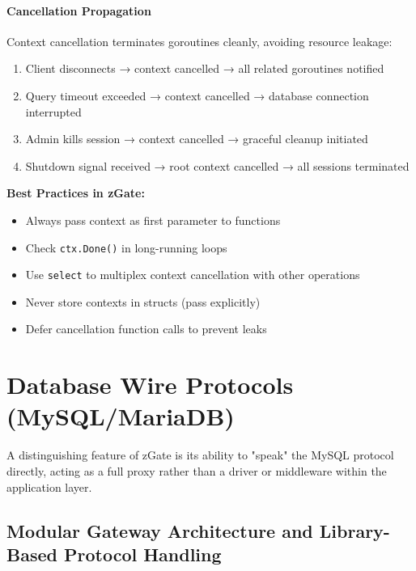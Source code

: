 \paragraph{Cancellation Propagation}

Context cancellation terminates goroutines cleanly, avoiding resource leakage:

\begin{enumerate}
    \item Client disconnects → context cancelled → all related goroutines notified
    \item Query timeout exceeded → context cancelled → database connection interrupted
    \item Admin kills session → context cancelled → graceful cleanup initiated
    \item Shutdown signal received → root context cancelled → all sessions terminated
\end{enumerate}

\textbf{Best Practices in zGate:}
\begin{itemize}
    \item Always pass context as first parameter to functions
    \item Check \texttt{ctx.Done()} in long-running loops
    \item Use \texttt{select} to multiplex context cancellation with other operations
    \item Never store contexts in structs (pass explicitly)
    \item Defer cancellation function calls to prevent leaks
\end{itemize}

\section{Database Wire Protocols (MySQL/MariaDB)}

A distinguishing feature of zGate is its ability to "speak" the MySQL protocol directly, acting as a full proxy rather than a driver or middleware within the application layer.

\subsection{Modular Gateway Architecture and Library-Based Protocol Handling}

